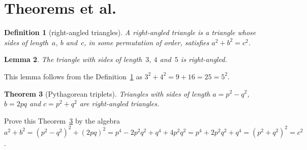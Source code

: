 \documentclass[a4paper]{article}
\begin{document}
    
    \section{Theorems et al.}
    
    \newtheorem{theorem}{Theorem}
    \newtheorem{corollary}[theorem]{Corollary}
    \newtheorem{lemma}[theorem]{Lemma}
    \newtheorem{definition}[theorem]{Definition}
    
    \begin{definition}[right-angled triangles] \label{def:tri}
    A \emph{right-angled triangle} is a triangle whose sides of length~\(a\), \(b\) and~\(c\), in some permutation of order, satisfies \(a^2+b^2=c^2\).
    \end{definition}
    
    \begin{lemma} 
    The triangle with sides of length~\(3\), \(4\) and~\(5\) is right-angled.
    \end{lemma}
    
    This lemma follows from the Definition~\ref{def:tri} as \(3^2+4^2=9+16=25=5^2\).
    
    \begin{theorem}[Pythagorean triplets] \label{thm:py}
    Triangles with sides of length \(a=p^2-q^2\), \(b=2pq\) and \(c=p^2+q^2\) are right-angled triangles.
    \end{theorem}
    
    Prove this Theorem~\ref{thm:py} by the algebra \(a^2+b^2 =(p^2-q^2)^2+(2pq)^2
    =p^4-2p^2q^2+q^4+4p^2q^2
    =p^4+2p^2q^2+q^4
    =(p^2+q^2)^2 =c^2\).
    
    
    
    
\end{document}
